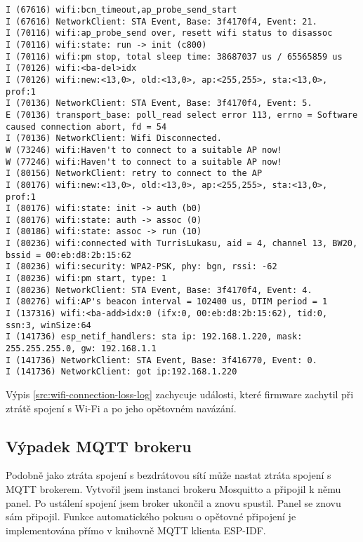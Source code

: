 \begin{lstlisting}[label=src:wifi-connection-loss-log,caption={Záznam událostí firmwaru při ztrátě spojení s Wi-Fi}]
I (67616) wifi:bcn_timeout,ap_probe_send_start
I (67616) NetworkClient: STA Event, Base: 3f4170f4, Event: 21.
I (70116) wifi:ap_probe_send over, resett wifi status to disassoc
I (70116) wifi:state: run -> init (c800)
I (70116) wifi:pm stop, total sleep time: 38687037 us / 65565859 us
I (70126) wifi:<ba-del>idx
I (70126) wifi:new:<13,0>, old:<13,0>, ap:<255,255>, sta:<13,0>, prof:1
I (70136) NetworkClient: STA Event, Base: 3f4170f4, Event: 5.
E (70136) transport_base: poll_read select error 113, errno = Software caused connection abort, fd = 54
I (70136) NetworkClient: Wifi Disconnected.
W (73246) wifi:Haven't to connect to a suitable AP now!
W (77246) wifi:Haven't to connect to a suitable AP now!
I (80156) NetworkClient: retry to connect to the AP
I (80176) wifi:new:<13,0>, old:<13,0>, ap:<255,255>, sta:<13,0>, prof:1
I (80176) wifi:state: init -> auth (b0)
I (80176) wifi:state: auth -> assoc (0)
I (80186) wifi:state: assoc -> run (10)
I (80236) wifi:connected with TurrisLukasu, aid = 4, channel 13, BW20, bssid = 00:eb:d8:2b:15:62
I (80236) wifi:security: WPA2-PSK, phy: bgn, rssi: -62
I (80236) wifi:pm start, type: 1
I (80236) NetworkClient: STA Event, Base: 3f4170f4, Event: 4.
I (80276) wifi:AP's beacon interval = 102400 us, DTIM period = 1
I (137316) wifi:<ba-add>idx:0 (ifx:0, 00:eb:d8:2b:15:62), tid:0, ssn:3, winSize:64
I (141736) esp_netif_handlers: sta ip: 192.168.1.220, mask: 255.255.255.0, gw: 192.168.1.1
I (141736) NetworkClient: STA Event, Base: 3f416770, Event: 0.
I (141736) NetworkClient: got ip:192.168.1.220
\end{lstlisting}

Výpis \ref{src:wifi-connection-loss-log} zachycuje události, které firmware zachytil při ztrátě spojení s Wi-Fi a po jeho opětovném navázání.

\subsection{Výpadek MQTT brokeru}
Podobně jako ztráta spojení s bezdrátovou sítí může nastat ztráta spojení s MQTT brokerem. Vytvořil jsem instanci brokeru Mosquitto a připojil k němu panel. Po ustálení spojení jsem broker ukončil a znovu spustil. Panel se znovu sám připojil. Funkce automatického pokusu o opětovné připojení je implementována přímo v knihovně MQTT klienta ESP-IDF.


